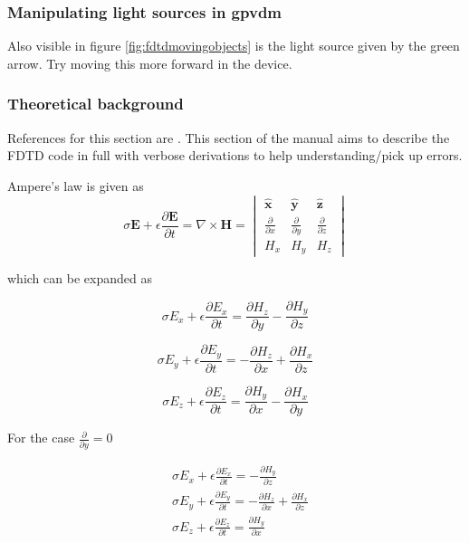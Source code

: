 \subsubsection{Manipulating light sources in gpvdm}
 Also visible in figure \ref{fig:fdtdmovingobjects} is the light source given by the green arrow. Try moving this more forward in the device.

\subsubsection{Theoretical background}
References for this section are \cite{FDTD_Schneider}. This section of the manual aims to describe the FDTD code in full with verbose derivations to help understanding/pick up errors.

Ampere’s law is given as  \cite{FDTD_Schneider}
\begin{equation}
\sigma  \boldsymbol{E} + \epsilon \frac{\partial  \boldsymbol{E}}{\partial t} = \nabla \times \boldsymbol{H} =
\begin{vmatrix} \hat{\boldsymbol{x}} & \hat{\boldsymbol{y}} & \hat{\boldsymbol{z}} \\ 
\frac{\partial}{\partial x} & \frac{\partial}{\partial y} & \frac{\partial}{\partial z} \\ 
H_{x} & H_{y} & H_{z}
\end{vmatrix}
\end{equation}


which can be expanded as

\begin{equation}
\sigma  E_{x} + \epsilon \frac{\partial  E_{x}}{\partial t} = \frac{\partial  H_{z}}{\partial y}-\frac{\partial  H_{y}}{\partial z}
\end{equation}

\begin{equation}
\sigma  E_{y} + \epsilon \frac{\partial  E_{y}}{\partial t} = -\frac{\partial  H_{z}}{\partial x}+\frac{\partial  H_{x}}{\partial z}
\end{equation}

\begin{equation}
\sigma  E_{z} + \epsilon \frac{\partial  E_{z}}{\partial t} = \frac{\partial  H_{y}}{\partial x}-\frac{\partial  H_{x}}{\partial y}
\end{equation}


For the case $\frac{\partial}{\partial y}=0$

\begin{equation}
\begin{split}
&\sigma  E_{x} + \epsilon \frac{\partial  E_{x}}{\partial t} =-\frac{\partial  H_{y}}{\partial z}\\
&\sigma  E_{y} + \epsilon \frac{\partial  E_{y}}{\partial t} = -\frac{\partial  H_{z}}{\partial x}+\frac{\partial  H_{x}}{\partial z}\\
&\sigma  E_{z} + \epsilon \frac{\partial  E_{z}}{\partial t} = \frac{\partial  H_{y}}{\partial x}
\end{split}
\end{equation}

